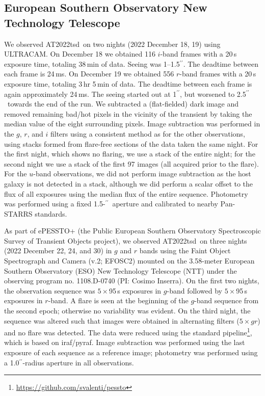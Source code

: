 \documentclass{nature_plusfigure}
\newcommand{\at}{AT2022tsd}
\newcommand{\arcsec}{$^{\prime\prime}$}
\begin{document}
\begin{methods}
\subsection{European Southern Observatory New Technology Telescope}
\label{sec:ntt}

We observed \at\ on two nights (2022 December 18, 19) using ULTRACAM\cite{Dhillon2007}. On December 18 we obtained 116 $i$-band frames with a 20\,s exposure time, totaling 38\,min of data. Seeing was 1--1.5\arcsec. The deadtime between each frame is 24\,ms. On December 19 we obtained 556 $r$-band frames with a 20\,s exposure time, totaling 3\,hr 5\,min of data. The deadtime between each frame is again approximately 24\,ms. The seeing started out at 1\arcsec, but worsened to 2.5\arcsec\ towards the end of the run. We subtracted a (flat-fielded) dark image and removed remaining bad/hot pixels in the vicinity of the transient by taking the median value of the eight surrounding pixels.  Image subtraction was performed in the $g$, $r$, and $i$ filters using a consistent method as for the other observations, using stacks formed from flare-free sections of the data taken the same night.  For the first night, which shows no flaring, we use a stack of the entire night; for the second night we use a stack of the first 97 images (all acquired prior to the flare).  For the $u$-band observations, we did not perform image subtraction as the host galaxy is not detected in a stack, although we did perform a scalar offset to the flux of all exposures using the median flux of the entire sequence.  Photometry was performed using a fixed 1.5-\arcsec\ aperture and calibrated to nearby Pan-STARRS standards.

As part of ePESSTO+ (the Public European Southern Observatory Spectroscopic Survey of Transient Objects project\cite{Smartt2015}), we observed \at\ on three nights (2022 December 22, 24, and 30) in $g$ and $r$ bands using the Faint Object Spectrograph and Camera (v.2; EFOSC2\cite{Buzzoni1984}) mounted on the 3.58-meter European Southern Observatory (ESO) New Technology Telescope (NTT) under the observing program no. 1108.D-0740 (PI: Cosimo Inserra). On the first two nights, the observation sequence was $5\times$95\,s exposures in $g$-band followed by $5\times$95\,s exposures in $r$-band.  A flare is seen at the beginning of the $g$-band sequence from the second epoch; otherwise no variability was evident. On the third night, the sequence was altered such that images were obtained in alternating filters ($5\times gr$) and no flare was detected. The data were reduced using the standard pipeline\footnote{\url{ https://github.com/svalenti/pessto}}, which is based on iraf/pyraf. Image subtraction was performed using the last exposure of each sequence as a reference image; photometry was performed using a 1.0\arcsec-radius aperture in all observations.


\end{methods}
\end{document}
